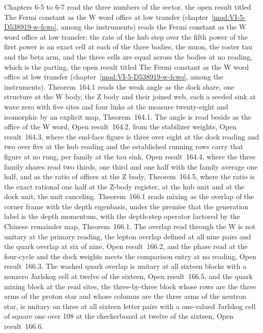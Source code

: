 Chapters 6-5 to 6-7 read the three numbers of the sector. the open result titled The Fermi constant as the W word office at low transfer (chapter~\ref{mod:VI-5-D538919-w-fcwo}, among the instruments) reads the Fermi constant as the W word office at low transfer: the rate of the hub step over the fifth power of the first power is an exact cell at each of the three bodies, the muon, the roster tau and the beta arm, and the three cells are equal across the bodies at no reading, which is the parting, the open result titled The Fermi constant as the W word office at low transfer (chapter~\ref{mod:VI-5-D538919-w-fcwo}, among the instruments). Theorem~164.1 reads the weak angle as the dock share, one structure at the W body, the Z body and their joined web, each a seeded sink at wave zero with five sites and four links at the measure twenty-eight and isomorphic by an explicit map, Theorem~164.1. The angle is read beside as the office of the W word, Open result~164.2, from the stabilizer weights, Open result~164.3, where the end-face figure is three over eight at the dock reading and two over five at the hub reading and the established running rows carry that figure at no rung, per family at the tau sink, Open result~164.4, where the three family shares read two thirds, one third and one half with the family average one half, and as the ratio of offices at the Z body, Theorem~164.5, where the ratio is the exact rational one half at the Z-body register, at the hub unit and at the dock unit, the unit canceling. Theorem~166.1 reads mixing as the overlap of the corner frame with the depth eigenbasis, under the premise that the generation label is the depth momentum, with the depth-step operator factored by the Chinese remainder map, Theorem~166.1. The overlap read through the W is not unitary at the primary reading, the lepton overlap defined at all nine pairs and the quark overlap at six of nine, Open result~166.2, and the phase read at the four-cycle and the dock weights meets the comparison entry at no reading, Open result~166.3. The washed quark overlap is unitary at all sixteen blocks with a nonzero Jarlskog cell at twelve of the sixteen, Open result~166.5, and the quark mixing block at the read sites, the three-by-three block whose rows are the three arms of the proton star and whose columns are the three arms of the neutron star, is unitary on three at all sixteen letter pairs with a one-valued Jarlskog cell of square one over 108 at the checkerboard at twelve of the sixteen, Open result~166.6.

